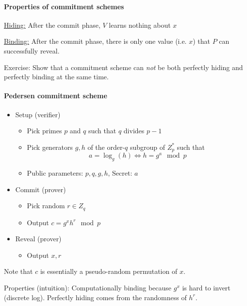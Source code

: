 \paragraph{Properties of commitment schemes}\mbox{}

\underline{Hiding:} After the commit phase, $V$ learns nothing about $x$

\underline{Binding:} After the commit phase, there is only one value (i.e. $x$) that $P$ can successfully reveal.

{ \scriptsize Exercise: Show that a commitment scheme can \textit{not} be both perfectly hiding and perfectly binding at the same time. }

\paragraph{Pedersen commitment scheme}
\begin{itemize}
    \item Setup (verifier)
    \begin{itemize}
        \item Pick primes $p$ and $q$ such that $q$ divides $p-1$
        \item Pick generators $g, h$ of the order-$q$ subgroup of $Z_p^*$ such that
            $$ a = \log_g(h) \Leftrightarrow h = g^a \mod p $$
        \item Public parameters: $p, q, g, h$, Secret: $a$
    \end{itemize}
    \item Commit (prover)
    \begin{itemize}
        \item Pick random $r \in Z_q$
        \item Output $c = g^x h^r \mod p$
    \end{itemize}
    \item Reveal (prover)
    \begin{itemize}
        \item Output $x, r$
     \end{itemize}
\end{itemize}

Note that $c$ is essentially a pseudo-random permutation of $x$.

Properties (intuition): Computationally binding because $g^x$ is hard to invert (discrete log). Perfectly hiding comes from the randomness of $h^r$.


